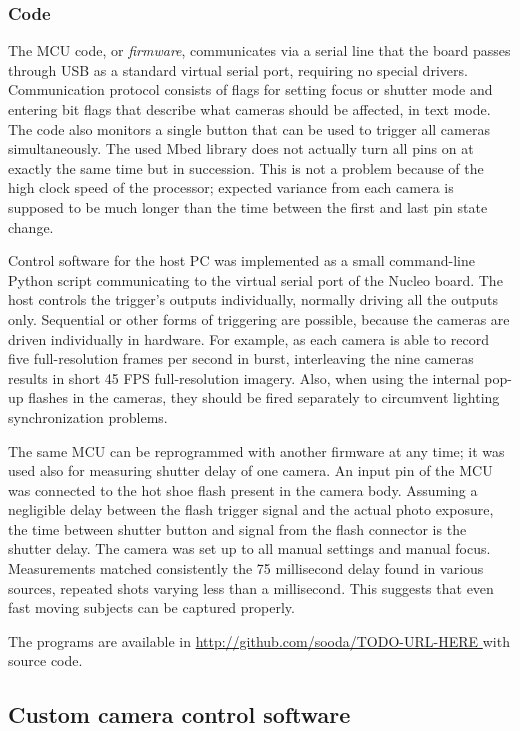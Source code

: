 \subsubsection{Code}

The MCU code, or \emph{firmware}, communicates via a serial line that the board passes through USB as a standard virtual serial port, requiring no special drivers.
Communication protocol consists of flags for setting focus or shutter mode and entering bit flags that describe what cameras should be affected, in text mode.
The code also monitors a single button that can be used to trigger all cameras simultaneously.
The used Mbed library does not actually turn all pins on at exactly the same time but in succession.
This is not a problem because of the high clock speed of the processor; expected variance from each camera is supposed to be much longer than the time between the first and last pin state change. %

Control software for the host PC was implemented as a small command-line Python script communicating to the virtual serial port of the Nucleo board.
The host controls the trigger's outputs individually, normally driving all the outputs only.
Sequential or other forms of triggering are possible, because the cameras are driven individually in hardware.
For example, as each camera is able to record five full-resolution frames per second in burst, interleaving the nine cameras results in short 45 FPS full-resolution imagery.
Also, when using the internal pop-up flashes in the cameras, they should be fired separately to circumvent lighting synchronization problems.

The same MCU can be reprogrammed with another firmware at any time; it was used also for measuring shutter delay of one camera.
An input pin of the MCU was connected to the hot shoe flash present in the camera body.
Assuming a negligible delay between the flash trigger signal and the actual photo exposure, the time between shutter button and signal from the flash connector is the shutter delay.
The camera was set up to all manual settings and manual focus.
Measurements matched consistently the 75 millisecond delay found in various sources, repeated shots varying less than a millisecond.
This suggests that even fast moving subjects can be captured properly.

The programs are available in \url { http://github.com/sooda/TODO-URL-HERE } with source code.


\subsection{Custom camera control software} %

